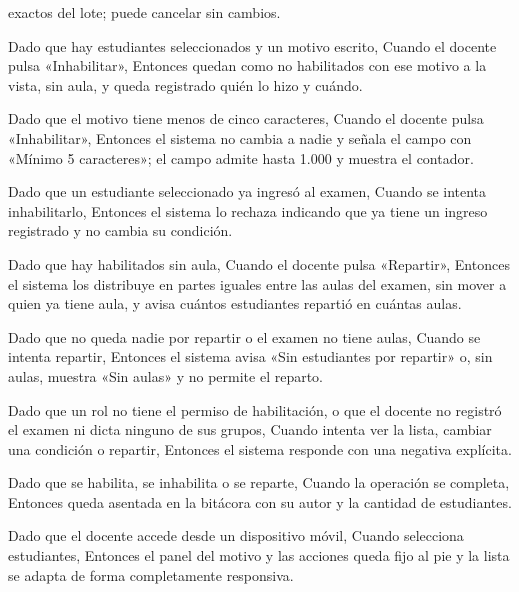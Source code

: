 {      exactos del lote; puede cancelar sin cambios.
\item Dado que hay estudiantes seleccionados y un motivo escrito, Cuando el docente pulsa
      «Inhabilitar», Entonces quedan como no habilitados con ese motivo a la vista, sin
      aula, y queda registrado quién lo hizo y cuándo.
\item Dado que el motivo tiene menos de cinco caracteres, Cuando el docente pulsa
      «Inhabilitar», Entonces el sistema no cambia a nadie y señala el campo con «Mínimo
      5 caracteres»; el campo admite hasta 1.000 y muestra el contador.
\item Dado que un estudiante seleccionado ya ingresó al examen, Cuando se intenta
      inhabilitarlo, Entonces el sistema lo rechaza indicando que ya tiene un ingreso
      registrado y no cambia su condición.
\item Dado que hay habilitados sin aula, Cuando el docente pulsa «Repartir», Entonces el
      sistema los distribuye en partes iguales entre las aulas del examen, sin mover a
      quien ya tiene aula, y avisa cuántos estudiantes repartió en cuántas aulas.
\item Dado que no queda nadie por repartir o el examen no tiene aulas, Cuando se intenta
      repartir, Entonces el sistema avisa «Sin estudiantes por repartir» o, sin aulas,
      muestra «Sin aulas» y no permite el reparto.
\item Dado que un rol no tiene el permiso de habilitación, o que el docente no registró
      el examen ni dicta ninguno de sus grupos, Cuando intenta ver la lista, cambiar una
      condición o repartir, Entonces el sistema responde con una negativa explícita.
\item Dado que se habilita, se inhabilita o se reparte, Cuando la operación se completa,
      Entonces queda asentada en la bitácora con su autor y la cantidad de estudiantes.
\item Dado que el docente accede desde un dispositivo móvil, Cuando selecciona
      estudiantes, Entonces el panel del motivo y las acciones queda fijo al pie y la
      lista se adapta de forma completamente responsiva.}

